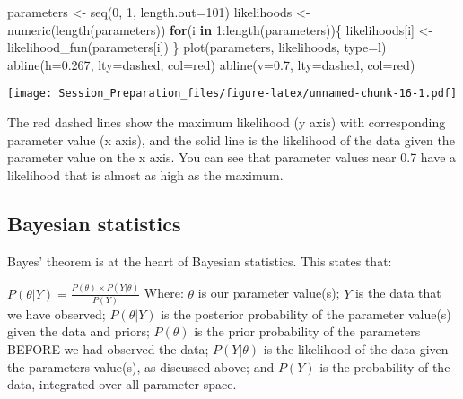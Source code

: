 \documentclass[
  12pt,
]{article}
\newenvironment{Shaded}{\begin{snugshade}}{\end{snugshade}}
\newcommand{\AttributeTok}[1]{\textcolor[rgb]{0.77,0.63,0.00}{#1}}
\newcommand{\ControlFlowTok}[1]{\textcolor[rgb]{0.13,0.29,0.53}{\textbf{#1}}}
\newcommand{\DecValTok}[1]{\textcolor[rgb]{0.00,0.00,0.81}{#1}}
\newcommand{\FloatTok}[1]{\textcolor[rgb]{0.00,0.00,0.81}{#1}}
\newcommand{\FunctionTok}[1]{\textcolor[rgb]{0.00,0.00,0.00}{#1}}
\newcommand{\NormalTok}[1]{#1}
\newcommand{\OtherTok}[1]{\textcolor[rgb]{0.56,0.35,0.01}{#1}}
\newcommand{\SpecialCharTok}[1]{\textcolor[rgb]{0.00,0.00,0.00}{#1}}
\newcommand{\StringTok}[1]{\textcolor[rgb]{0.31,0.60,0.02}{#1}}
\begin{document}
\begin{Shaded}
\begin{Highlighting}[]
\NormalTok{parameters }\OtherTok{\textless{}{-}} \FunctionTok{seq}\NormalTok{(}\DecValTok{0}\NormalTok{, }\DecValTok{1}\NormalTok{, }\AttributeTok{length.out=}\DecValTok{101}\NormalTok{)}
\NormalTok{likelihoods }\OtherTok{\textless{}{-}} \FunctionTok{numeric}\NormalTok{(}\FunctionTok{length}\NormalTok{(parameters))}
\ControlFlowTok{for}\NormalTok{(i }\ControlFlowTok{in} \DecValTok{1}\SpecialCharTok{:}\FunctionTok{length}\NormalTok{(parameters))\{}
\NormalTok{    likelihoods[i] }\OtherTok{\textless{}{-}} \FunctionTok{likelihood\_fun}\NormalTok{(parameters[i])}
\NormalTok{\}}
\FunctionTok{plot}\NormalTok{(parameters, likelihoods, }\AttributeTok{type=}\StringTok{\textquotesingle{}l\textquotesingle{}}\NormalTok{)}
\FunctionTok{abline}\NormalTok{(}\AttributeTok{h=}\FloatTok{0.267}\NormalTok{, }\AttributeTok{lty=}\StringTok{\textquotesingle{}dashed\textquotesingle{}}\NormalTok{, }\AttributeTok{col=}\StringTok{\textquotesingle{}red\textquotesingle{}}\NormalTok{)}
\FunctionTok{abline}\NormalTok{(}\AttributeTok{v=}\FloatTok{0.7}\NormalTok{, }\AttributeTok{lty=}\StringTok{\textquotesingle{}dashed\textquotesingle{}}\NormalTok{, }\AttributeTok{col=}\StringTok{\textquotesingle{}red\textquotesingle{}}\NormalTok{)}
\end{Highlighting}
\end{Shaded}

\texttt{[image: Session\_Preparation\_files/figure-latex/unnamed-chunk-16-1.pdf]}

The red dashed lines show the maximum likelihood (y axis) with
corresponding parameter value (x axis), and the solid line is the
likelihood of the data given the parameter value on the x axis. You can
see that parameter values near 0.7 have a likelihood that is almost as
high as the maximum.

\hypertarget{bayesian-statistics}{%
\subsection{Bayesian statistics}\label{bayesian-statistics}}

Bayes' theorem is at the heart of Bayesian statistics. This states that:

\(P(\theta|Y) = \frac{P(\theta)\times P(Y|\theta)}{P(Y)}\) Where:
\(\theta\) is our parameter value(s); \(Y\) is the data that we have
observed; \(P(\theta|Y)\) is the posterior probability of the parameter
value(s) given the data and priors; \(P(\theta)\) is the prior
probability of the parameters BEFORE we had observed the data;
\(P(Y|\theta)\) is the likelihood of the data given the parameters
value(s), as discussed above; and \(P(Y)\) is the probability of the
data, integrated over all parameter space.
\end{document}
